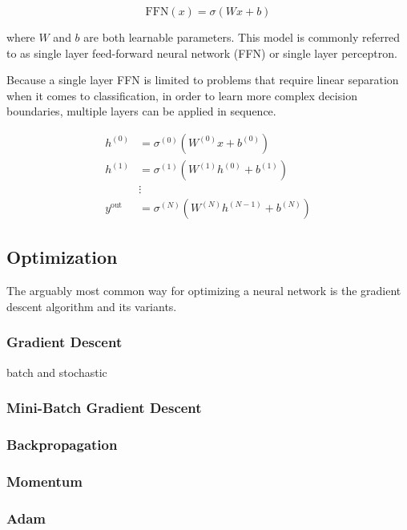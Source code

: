 \begin{equation}
    \text{FFN}(x) = \sigma(W x + b)
\end{equation}

where $W$ and $b$ are both learnable parameters.
This model is commonly referred to as single layer feed-forward neural network (FFN) or single layer perceptron.

Because a single layer FFN is limited to problems that require linear separation when it comes to classification, in order to learn more complex decision boundaries, multiple layers can be applied in sequence.

\begin{equation}
    \begin{split}
        h^{(0)} &= \sigma^{(0)}(W^{(0)} x + b^{(0)}) \\
        h^{(1)} &= \sigma^{(1)}(W^{(1)} h^{(0)} + b^{(1)}) \\
        & \vdots \\
        y^{\text{out}} &= \sigma^{(N)}(W^{(N)} h^{(N-1)} + b^{(N)})
    \end{split}
\end{equation}


\subsection{Optimization}
The arguably most common way for optimizing a neural network is the gradient descent algorithm and its variants.

\subsubsection{Gradient Descent}
batch and stochastic

\subsubsection{Mini-Batch Gradient Descent}

\subsubsection{Backpropagation}

\subsubsection{Momentum}
\subsubsection{Adam}

